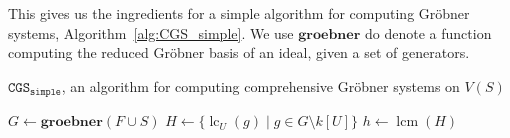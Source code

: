 \documentclass[a4paper, 12pt]{article}
\DeclareMathOperator{\LC}{lc}
\DeclareMathOperator{\lcm}{lcm}
\theoremstyle{changedot}
\theoremstyle{changedotbreak}
\theoremstyle{nonumberplain}
\begin{document}
This gives us the ingredients for a simple algorithm for computing Gröbner systems, Algorithm~\ref{alg:CGS_simple}. We use $\mathbf{groebner}$ do denote a function computing the reduced Gröbner basis of an ideal, given a set of generators.

\begin{algorithm}\label{alg:CGS_simple}
  \caption{$\mathtt{CGS_{simple}}$, an algorithm for computing comprehensive Gröbner systems on $V(S)$}
    {
    \KwRet{\emptyset}\;
  } {
    $G \gets \mathbf{groebner}(F \cup S)$\;
    $H \gets \{\LC_{U}(g) \mid g \in G \setminus k[U]\}$\;
    $h \gets \lcm(H)$\;
  }
\end{algorithm}
\end{document}
